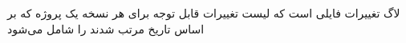 لاگ تغییرات فایلی است که لیست تغییرات قابل توجه برای هر نسخه یک پروژه که بر اساس تاریخ مرتب شدند را شامل می‌شود


